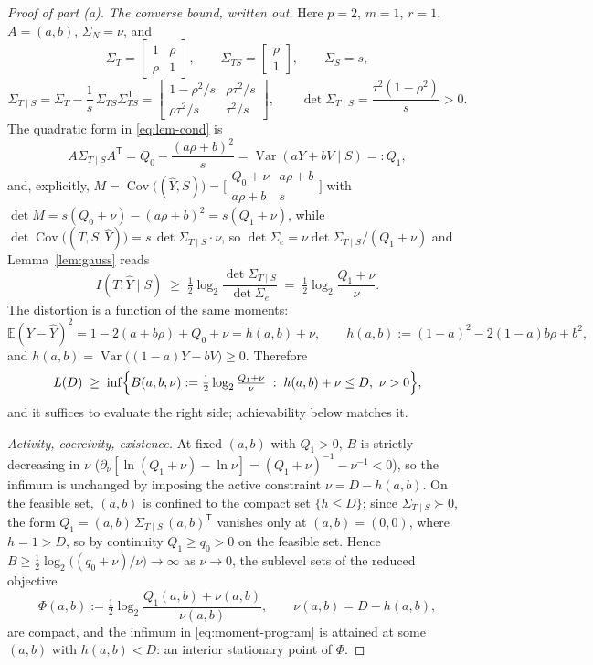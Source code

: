 \documentclass[11pt,onecolumn]{IEEEtran}
\newcommand{\E}{\mathbb{E}}
\newcommand{\Cov}{\operatorname{Cov}}
\newcommand{\hY}{\widehat{Y}}
\begin{document}
\begin{proof}[Proof of part (a)]
\emph{The converse bound, written out.} Here $p=2$, $m=1$, $r=1$,
$A=(a,b)$, $\Sigma_N=\nu$, and
\[
\Sigma_T=\begin{bmatrix}1&\rho\\ \rho&1\end{bmatrix},
\qquad
\Sigma_{TS}=\begin{bmatrix}\rho\\ 1\end{bmatrix},
\qquad
\Sigma_S=s,
\]
\[
\Sigma_{T\mid S}
=\Sigma_T-\frac1s\,\Sigma_{TS}\Sigma_{TS}^{\mathsf T}
=\begin{bmatrix}1-\rho^2/s&\rho\tau^2/s\\[2pt]
\rho\tau^2/s&\tau^2/s\end{bmatrix},
\qquad
\det\Sigma_{T\mid S}=\frac{\tau^2(1-\rho^2)}{s}>0 .
\]
The quadratic form in \eqref{eq:lem-cond} is
\[
A\Sigma_{T\mid S}A^{\mathsf T}
=Q_0-\frac{(a\rho+b)^2}{s}
=\operatorname{Var}(aY+bV\mid S)=:Q_1 ,
\]
and, explicitly, $M=\Cov\bigl((\hY,S)\bigr)=
\bigl[\begin{smallmatrix}Q_0+\nu&a\rho+b\\ a\rho+b&s\end{smallmatrix}\bigr]$
with $\det M=s(Q_0+\nu)-(a\rho+b)^2=s(Q_1+\nu)$, while
$\det\Cov\bigl((T,S,\hY)\bigr)=s\,\det\Sigma_{T\mid S}\cdot \nu$, so
$\det\Sigma_e=\nu\det\Sigma_{T\mid S}/(Q_1+\nu)$ and Lemma~\ref{lem:gauss}
reads
\begin{equation}
I(T;\hY\mid S)\;\ge\;
\tfrac12\log_2\frac{\det\Sigma_{T\mid S}}{\det\Sigma_e}
\;=\;\tfrac12\log_2\frac{Q_1+\nu}{\nu} .
\label{eq:scalar-detid}
\end{equation}
The distortion is a function of the same moments:
\begin{equation}
\E(Y-\hY)^2=1-2(a+b\rho)+Q_0+\nu=h(a,b)+\nu,
\qquad
h(a,b):=(1-a)^2-2(1-a)b\rho+b^2,
\label{eq:distortion}
\end{equation}
and $h(a,b)=\operatorname{Var}\bigl((1-a)Y-bV\bigr)\ge0$. Therefore
\begin{equation}
L(D)\;\ge\;
\inf\Bigl\{B(a,b,\nu):=\tfrac12\log_2\tfrac{Q_1+\nu}{\nu}
\;:\;h(a,b)+\nu\le D,\ \nu>0\Bigr\},
\label{eq:moment-program}
\end{equation}
and it suffices to evaluate the right side; achievability below
matches it.

\emph{Activity, coercivity, existence.} At fixed $(a,b)$ with $Q_1>0$,
$B$ is strictly decreasing in $\nu$
($\partial_\nu[\ln(Q_1+\nu)-\ln \nu]=(Q_1+\nu)^{-1}-\nu^{-1}<0$), so the infimum
is unchanged by imposing the active constraint $\nu=D-h(a,b)$. On the
feasible set, $(a,b)$ is confined to the compact set $\{h\le D\}$;
since $\Sigma_{T\mid S}\succ0$, the form
$Q_1=(a,b)\,\Sigma_{T\mid S}\,(a,b)^{\mathsf T}$ vanishes only at
$(a,b)=(0,0)$, where $h=1>D$, so by continuity $Q_1\ge q_0>0$ on the
feasible set. Hence $B\ge\tfrac12\log_2\bigl((q_0+\nu)/\nu\bigr)\to\infty$
as $\nu\to0$, the sublevel sets of the reduced objective
\[
\Phi(a,b):=\tfrac12\log_2\frac{Q_1(a,b)+\nu(a,b)}{\nu(a,b)},
\qquad \nu(a,b)=D-h(a,b),
\]
are compact, and the infimum in \eqref{eq:moment-program} is attained
at some $(a,b)$ with $h(a,b)<D$: an interior stationary point of
$\Phi$.


\end{proof}
\end{document}
